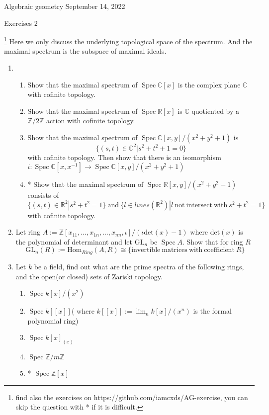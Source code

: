 \documentclass[a4paper,11pt]{article}
\def\bb#1{\mathbb{#1}}
\def\bZ{\mathbb{Z}}
\def\Zmd#1{\bZ/#1\bZ}
\def\mrm#1{\mathrm{#1}}
\def\Hom{\mathrm{Hom}}
\DeclareMathOperator{\Spec}{Spec}
\begin{document}
{\small Algebraic geometry \hfill September 14, 2022 \\}
\begin{center}
\Huge Exercises 2
\end{center}

\vskip0.6cm
\footnote{find also the exercises on https://github.com/iamcxds/AG-exercise, you can skip the question with * if it is difficult.}
Here we only discuss the underlying topological space of the spectrum. And the maximal spectrum is the subspace of maximal ideals.
\begin{enumerate}[1.]
\item 
\begin{enumerate}
    \item Show that the maximal spectrum of $\Spec\bb{C}[x]$ is the complex plane $\bb{C}$ with cofinite topology.
    \item Show that the maximal spectrum of $\Spec \bb{R}[x]$ is $\bb{C}$ quotiented by a $\Zmd{2}$ action with cofinite topology.
    \item Show that the maximal spectrum of $\Spec \bb{C}[x,y]/(x^2+y^2+1)$ is 
    \[\{(s,t)\in \bb{C}^2|s^2+t^2+1=0\}\] with cofinite topology. Then show that there is an isomorphism $i: \Spec \bb{C}[x,x^{-1}] \to \Spec \bb{C}[x,y]/(x^2+y^2+1)$
    \item* Show that the maximal spectrum of $\Spec \bb{R}[x,y]/(x^2+y^2-1)$ consists of 
    \[\{(s,t)\in \bb{R}^2|s^2+t^2=1\} \mrm{ \ and\ } \{ l\in lines(\bb{R}^2)|l\mrm{ \ not \ intersect\ with\ } s^2+t^2=1\} \] 
    with cofinite topology.
    
\end{enumerate}
\item Let ring $ A:= \bZ[x_{11},\ldots,x_{1n},\ldots,x_{nn},\iota]/(\iota\mrm{det}(x)-1) $ where $\mrm{det}(x)$ is the polynomial of determinant and let $\mrm{GL}_n$ be $ \Spec A $. Show that for ring $R$ \[\mrm{GL}_n(R):=\Hom_{Ring}(A, R)\cong 
\{\mrm{ invertible\ matrices\ with\ coefficient\ } R\} \]
\item Let $k$ be a field, find out what are the prime spectra of the following rings, and the open(or closed) sets of Zariski topology.
\begin{enumerate}
    \item  $\Spec k[x]/(x^2)$
    \item  $\Spec k[[x]]$( where $k[[x]] := \lim_n k[x]/(x^n)$ is the formal polynomial ring)
    \item  $\Spec k[x]_{(x)}$
    \item $\Spec \Zmd{m}$
    \item*  $\Spec \bZ[x]$
\end{enumerate}



\end{enumerate}
\end{document}
